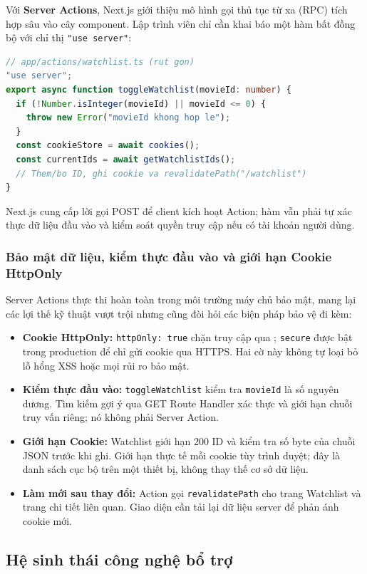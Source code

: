 \documentclass[12pt,a4paper]{extarticle}
\begin{document}
Với \textbf{Server Actions}, Next.js giới thiệu mô hình gọi thủ tục từ xa (RPC) tích hợp sâu vào cây component. Lập trình viên chỉ cần khai báo một hàm bất đồng bộ với chỉ thị \texttt{"use server"}:
\begin{lstlisting}[language=TypeScript]
// app/actions/watchlist.ts (rut gon)
"use server";
export async function toggleWatchlist(movieId: number) {
  if (!Number.isInteger(movieId) || movieId <= 0) {
    throw new Error("movieId khong hop le");
  }
  const cookieStore = await cookies();
  const currentIds = await getWatchlistIds();
  // Them/bo ID, ghi cookie va revalidatePath("/watchlist")
}
\end{lstlisting}

Next.js cung cấp lời gọi POST để client kích hoạt Action; hàm vẫn phải tự xác thực dữ liệu đầu vào và kiểm soát quyền truy cập nếu có tài khoản người dùng.

\subsubsection{Bảo mật dữ liệu, kiểm thực đầu vào và giới hạn Cookie HttpOnly}
Server Actions thực thi hoàn toàn trong môi trường máy chủ bảo mật, mang lại các lợi thế kỹ thuật vượt trội nhưng cũng đòi hỏi các biện pháp bảo vệ đi kèm:
\begin{itemize}[noitemsep]
    \item \textbf{Cookie HttpOnly:} \texttt{httpOnly: true} chặn truy cập qua ; \texttt{secure} được bật trong production để chỉ gửi cookie qua HTTPS. Hai cờ này không tự loại bỏ lỗ hổng XSS hoặc mọi rủi ro bảo mật.
    \item \textbf{Kiểm thực đầu vào:} \texttt{toggleWatchlist} kiểm tra \texttt{movieId} là số nguyên dương. Tìm kiếm gợi ý qua GET Route Handler xác thực và giới hạn chuỗi truy vấn riêng; nó không phải Server Action.
    \item \textbf{Giới hạn Cookie:} Watchlist giới hạn 200 ID và kiểm tra số byte của chuỗi JSON trước khi ghi. Giới hạn thực tế mỗi cookie tùy trình duyệt; đây là danh sách cục bộ trên một thiết bị, không thay thế cơ sở dữ liệu.
    \item \textbf{Làm mới sau thay đổi:} Action gọi \texttt{revalidatePath} cho trang Watchlist và trang chi tiết liên quan. Giao diện cần tải lại dữ liệu server để phản ánh cookie mới.
\end{itemize}

\subsection{Hệ sinh thái công nghệ bổ trợ}
\end{document}
